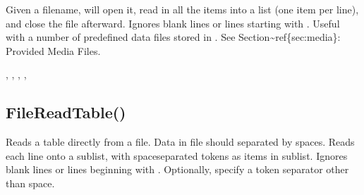 \documentclass[letterpaper,10pt,english]{sphinxmanual}
\begin{document}
\sphinxAtStartPar
{}

\sphinxAtStartPar
Given a filename, will open it, read in all the   items into a list (one item per line), and close the file afterward.   Ignores blank lines or lines starting with \sphinxcode{\sphinxupquote{\#}}.  Useful with a   number of pre\sphinxhyphen{}defined data files stored in .  See   Section\textasciitilde{}ref\{sec:media\}: Provided Media Files.

\sphinxAtStartPar
{}

\begin{sphinxVerbatim}[commandchars=\\\{\}]
\end{sphinxVerbatim}

\sphinxAtStartPar
{}

\begin{sphinxVerbatim}[commandchars=\\\{\}]
\end{sphinxVerbatim}

\sphinxAtStartPar
{}

\sphinxAtStartPar
{},     ,         ,         ,

\ignorespaces 

\subsection{FileReadTable()}
\label{\detokenize{reference/peblstream:filereadtable}}\label{\detokenize{reference/peblstream:index-18}}
\sphinxAtStartPar
{}

\sphinxAtStartPar
Reads a table directly from a file. Data in file should                 separated by spaces.  Reads each line onto a sublist,           with space\sphinxhyphen{}separated tokens as items in sublist.  Ignores               blank lines or lines beginning with \sphinxcode{\sphinxupquote{\#}}. Optionally,          specify a token separator other than space.
\end{document}
